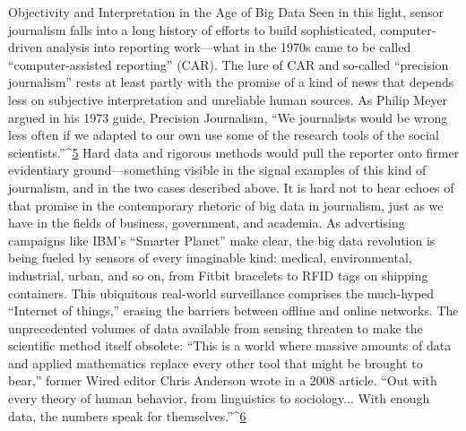 Objectivity and Interpretation in the Age of Big Data
Seen in this light, sensor journalism falls into a long history of efforts to
build sophisticated, computer-driven analysis into reporting work—what in
the 1970s came to be called ``computer-assisted reporting'' (CAR). The lure
of CAR and so-called ``precision journalism'' rests at least partly with the
promise of a kind of news that depends less on subjective interpretation and
unreliable human sources. As Philip Meyer argued in his 1973 guide, Precision
Journalism, ``We journalists would be wrong less often if we adapted to
our own use some of the research tools of the social scientists.''^{\href{#endnotes-graves}{5}} Hard data
and rigorous methods would pull the reporter onto firmer evidentiary
ground—something visible in the signal examples of this kind of journalism,
and in the two cases described above.
It is hard not to hear echoes of that promise in the contemporary rhetoric of
big data in journalism, just as we have in the fields of business, government,
and academia. As advertising campaigns like IBM's ``Smarter Planet'' make
clear, the big data revolution is being fueled by sensors of every imaginable
kind: medical, environmental, industrial, urban, and so on, from Fitbit
bracelets to RFID tags on shipping containers. This ubiquitous real-world
surveillance comprises the much-hyped ``Internet of things,'' erasing the
barriers between offline and online networks. The unprecedented volumes
of data available from sensing threaten to make the scientific method itself
obsolete: ``This is a world where massive amounts of data and applied mathematics
replace every other tool that might be brought to bear,'' former
Wired editor Chris Anderson wrote in a 2008 article. ``Out with every theory
of human behavior, from linguistics to sociology... With enough data,
the numbers speak for themselves.''^{\href{#endnotes-graves}{6}}

